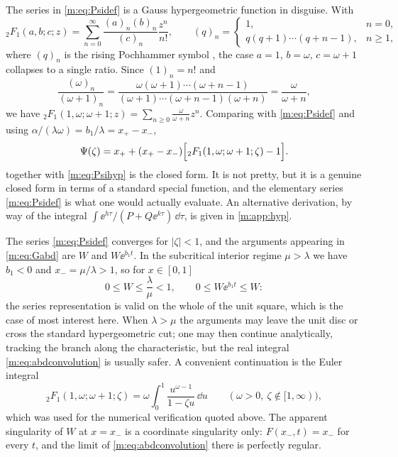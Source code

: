 The series in \cref{m:eq:Psidef} is a Gauss hypergeometric function in disguise.
With
\begin{equation}
\label{m:eq:2F1def}
{}_2F_1(a,b;c;z) = \sum_{n=0}^{\infty}\frac{(a)_n(b)_n}{(c)_n}\frac{z^n}{n!},
\qquad
(q)_n = \begin{cases}1, & n=0,\\ q(q+1)\cdots(q+n-1), & n\ge1,\end{cases}
\end{equation}
where $(q)_n$ is the rising Pochhammer symbol \cite{Olver2010}, the case $a=1$,
$b=\omega$, $c=\omega+1$ collapses to a single ratio. Since $(1)_n=n!$ and
\begin{equation}
\label{m:eq:pochcancel}
\frac{(\omega)_n}{(\omega+1)_n}
= \frac{\omega(\omega+1)\cdots(\omega+n-1)}{(\omega+1)\cdots(\omega+n-1)(\omega+n)}
= \frac{\omega}{\omega+n},
\end{equation}
we have ${}_2F_1(1,\omega;\omega+1;z) = \sum_{n\ge0}\frac{\omega}{\omega+n}z^n$.
Comparing with \cref{m:eq:Psidef} and using
$\alpha/(\lambda\omega) = b_1/\lambda = x_+-x_-$,
\begin{equation}
\label{m:eq:Psihyp}
\Psi(\zeta) = x_+ + (x_+-x_-)\Bigl[{}_2F_1(1,\omega;\omega+1;\zeta)-1\Bigr] .
\end{equation}
 together with \cref{m:eq:Psihyp} is the closed form. It is not
pretty, but it is a genuine closed form in terms of a standard special function,
and the elementary series \cref{m:eq:Psidef} is what one would actually evaluate. An
alternative derivation, by way of the integral
$\int\ee^{h\tau}/(P+Q\ee^{k\tau})\,\dd\tau$, is given in \cref{m:app:hyp}.

\begin{remark}
\label{m:rem:domain}
The series \cref{m:eq:Psidef} converges for $|\zeta|<1$, and the arguments appearing
in \cref{m:eq:Gabd} are $W$ and $W\ee^{b_1t}$. In the subcritical interior regime
$\mu>\lambda$ we have $b_1<0$ and $x_-=\mu/\lambda>1$, so for $x\in[0,1]$
\begin{equation*}
0\le W\le\frac{\lambda}{\mu}<1,
\qquad
0\le W\ee^{b_1t}\le W :
\end{equation*}
the series representation is valid on the whole of the unit square, which is the
case of most interest here. When $\lambda>\mu$ the arguments may leave the unit disc
or cross the standard hypergeometric cut; one may then continue analytically,
tracking the branch along the characteristic, but the real integral
\cref{m:eq:abdconvolution} is usually safer. A convenient continuation is the Euler
integral
\begin{equation*}
{}_2F_1(1,\omega;\omega+1;\zeta) = \omega\int_0^1\frac{u^{\omega-1}}{1-\zeta u}\,\dd u
\qquad(\omega>0,\ \zeta\notin[1,\infty)),
\end{equation*}
which was used for the numerical verification quoted above. The apparent
singularity of $W$ at $x=x_-$ is a coordinate singularity only: $F(x_-,t)=x_-$ for
every $t$, and the limit of \cref{m:eq:abdconvolution} there is perfectly regular.
\end{remark}

